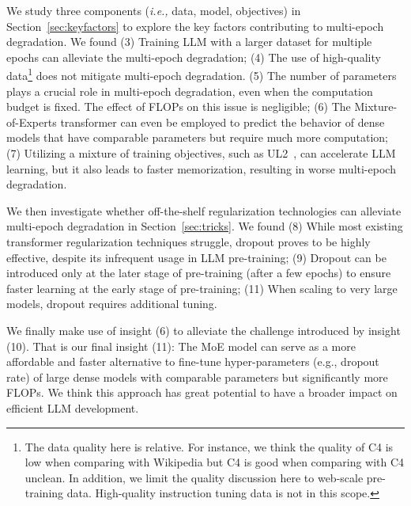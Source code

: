 \documentclass{article}
\newcommand{\ie}{\emph{i.e.,}\xspace}
\def\revise{\textcolor{red}}
\newcommand{\yao}[1]{{\color{cyan} YF: #1}}
\begin{document}
We study three components (\ie data, model, objectives) in Section~\ref{sec:keyfactors} to explore the key factors contributing to multi-epoch degradation. We found (3) Training LLM with a larger dataset for multiple epochs can alleviate the multi-epoch degradation; (4) The use of high-quality data\footnote{The data quality here is relative. For instance, we think the quality of C4 is low when comparing with Wikipedia but C4 is good when comparing with C4 unclean. In addition, we limit the quality discussion here to web-scale pre-training data. High-quality instruction tuning data is not in this scope.} does not mitigate multi-epoch degradation. 
(5) The number of parameters plays a crucial role in multi-epoch degradation, even when the computation budget is fixed. The effect of FLOPs on this issue is negligible; (6) The Mixture-of-Experts transformer can even be employed to predict the behavior of dense models that have comparable parameters but require much more computation; (7) Utilizing a mixture of training objectives, such as UL2~\citep{tay2022unifying}, can accelerate LLM learning, but it also leads to faster memorization, resulting in worse multi-epoch degradation.

We then investigate whether off-the-shelf regularization technologies can alleviate multi-epoch degradation in Section~\ref{sec:tricks}. We found (8) While most existing transformer regularization techniques struggle, dropout proves to be highly effective, despite its infrequent usage in LLM pre-training; (9) Dropout can be introduced only at the later stage of pre-training (after a few epochs) to ensure faster learning at the early stage of pre-training; (11) When scaling to very large models, dropout requires additional tuning.

We finally make use of insight (6) to alleviate the challenge introduced by insight (10). That is our final insight (11): The MoE model can serve as a more affordable and faster alternative to fine-tune hyper-parameters (e.g., dropout rate) of large dense models with comparable parameters but significantly more FLOPs. We think this approach has great potential to have a broader impact on efficient LLM development.



\end{document}
